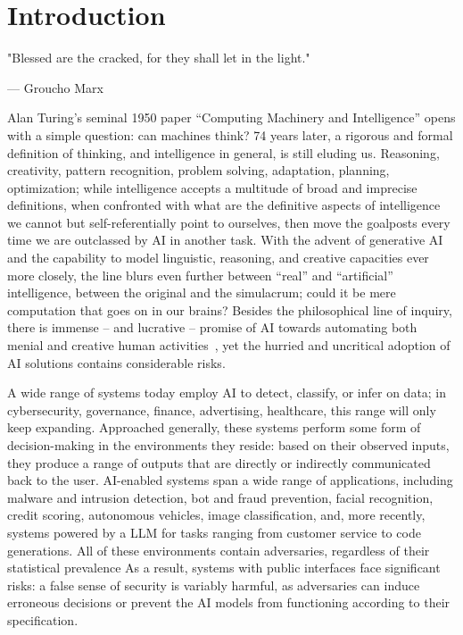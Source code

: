 \chapter{Introduction}\label{ch:introduction}

\epigraph{"Blessed are the cracked, for they shall let in the light."}{--- Groucho Marx}


Alan Turing's seminal 1950 paper ``Computing Machinery and Intelligence'' opens with a simple question: can machines think?
74 years later, a rigorous and formal definition of thinking, and intelligence in general, is still eluding us.
Reasoning, creativity, pattern recognition, problem solving, adaptation, planning, optimization; while intelligence accepts a multitude of broad and imprecise definitions, when confronted with what are the definitive aspects of intelligence we cannot but self-referentially point to ourselves, then move the goalposts every time we are outclassed by \gls{AI} in another task.
With the advent of generative \gls{AI} and the capability to model linguistic, reasoning, and creative capacities ever more closely, the line blurs even further between ``real'' and ``artificial'' intelligence, between the original and the simulacrum; could it be mere computation that goes on in our brains?
Besides the philosophical line of inquiry, there is immense -- and lucrative -- promise of \gls{AI} towards automating both menial and creative human activities~\cite{benjamin1935work}, yet the hurried and uncritical adoption of \gls{AI} solutions contains considerable risks.

A wide range of systems today employ \gls{AI} to detect, classify, or infer on data; in cybersecurity, governance, finance, advertising, healthcare, this range will only keep expanding.
Approached generally, these systems perform some form of decision-making in the environments they reside: based on their observed inputs, they produce a range of outputs that are directly or indirectly communicated back to the user.
AI-enabled systems span a wide range of applications, including malware and intrusion detection, bot and fraud prevention, facial recognition, credit scoring, autonomous vehicles, image classification, and, more recently, systems powered by a \gls{LLM} for tasks ranging from customer service to code generations.
All of these environments contain adversaries, regardless of their statistical prevalence
As a result, systems with public interfaces face significant risks: a false sense of security is variably harmful, as adversaries can induce erroneous decisions or prevent the \gls{AI} models from functioning according to their specification.

